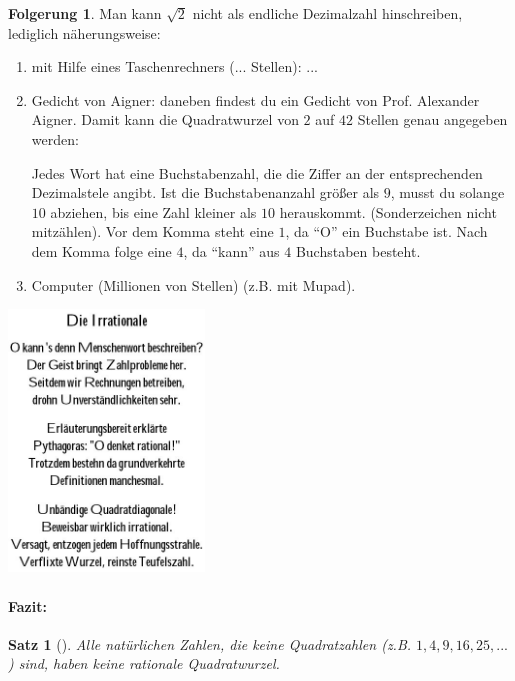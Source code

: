 \documentclass[a4paper, twoside, parskip, 10pt, smallheadings]{scrbook}
\theoremstyle{plain}
\newtheorem{Satz}{Satz}%
\theoremstyle{definition}
\newtheorem*{Folg}{Folgerung}
\newenvironment{fshaded}{%
\def\FrameCommand{\fcolorbox{framecolor}{shadecolor}}%
\MakeFramed {\FrameRestore}}%
{\endMakeFramed}
\newenvironment{fsatz}[1][]{\definecolor{shadecolor}{rgb}{.973,.513,.27}%
\definecolor{framecolor}{rgb}{1,0.25,0}%
\begin{fshaded}\begin{Satz}[#1]}{\end{Satz}\end{fshaded}}
\newcommand{\bn}{\begin{enumerate}}
\newcommand{\en}{\end{enumerate}}
\newcommand{\bs}{\begin{fsatz}}
\newcommand{\es}{\end{fsatz}}
\begin{document}
\begin{minipage}{10cm}
\begin{Folg}
Man kann $\sqrt{2}$ nicht als endliche Dezimalzahl hinschreiben, lediglich näherungsweise:
\bn \item mit Hilfe eines Taschenrechners (... Stellen): ...
\item Gedicht von Aigner: daneben findest du ein Gedicht von Prof. Alexander Aigner. Damit kann die Quadratwurzel von $2$ auf $42$ Stellen genau angegeben werden:

Jedes Wort hat eine Buchstabenzahl, die die Ziffer an der entsprechenden Dezimalstele angibt. Ist die Buchstabenanzahl größer als $9$, musst du solange $10$ abziehen, bis eine Zahl kleiner als $10$ herauskommt. (Sonderzeichen nicht mitzählen). Vor dem Komma steht eine $1$, da "`O"' ein Buchstabe ist. Nach dem Komma folge eine $4$, da "`kann"' aus $4$ Buchstaben besteht.
 
\item Computer (Millionen von Stellen) (z.B. mit Mupad).

\en\end{Folg}
\end{minipage}
\begin{minipage}{5.2cm}
\begin{flushright}
\includegraphics[width=5.2cm]{2te/reellezahlen/bilder/aigner.jpg}
\end{flushright}
\end{minipage}

\paragraph*{Fazit:}

\bs  Alle natürlichen Zahlen, die keine Quadratzahlen (z.B. $1, 4, 9, 16, 25, ...$) sind, haben keine rationale Quadratwurzel.\es 
 
\end{document}
